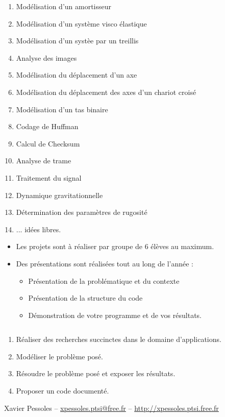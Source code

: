 \documentclass[10pt,fleqn]{article} %
\begin{document}

\vspace{10cm}
\pagestyle{fancy}
\thispagestyle{plain}


\def\columnseprulecolor{\color{ocre}}
\setlength{\columnseprule}{0.4pt} 



\begin{enumerate}
\item Modélisation d'un amortisseur
\item Modélisation d'un système visco élastique
\item Modélisation d'un systèe par un treillis
\item Analyse des images
\item Modélisation du déplacement d'un axe
\item Modélisation du déplacement des axes d'un chariot croisé
\item Modélisation d'un tas binaire
\item Codage de Huffman
\item Calcul de Checksum
\item Analyse de trame
\item Traitement du signal
\item Dynamique gravitationnelle
\item Détermination des paramètres de rugosité
\item ... idées libres.
\end{enumerate}

\begin{itemize}
\item Les projets sont à réaliser par groupe de 6 élèves au maximum.
\item Des présentations sont réalisées tout au long de l'année :
\begin{itemize}
\item Présentation de la problématique et du contexte
\item Présentation de la structure du code
\item Démonstration de votre programme et de vos résultats.
\end{itemize}
\end{itemize}
\begin{obj}
$\quad$\\
\begin{enumerate}
\item Réaliser des recherches succinctes dans le domaine d'applications. 
\item Modéliser le problème posé.
\item Résoudre le problème posé et exposer les résultats.
\item Proposer un code documenté.
\end{enumerate}
\end{obj}


\vfill
\begin{center}
Xavier Pessoles -- \url{xpessoles.ptsi@free.fr} -- \url{http://xpessoles.ptsi.free.fr}
\end{center}
\end{document}
